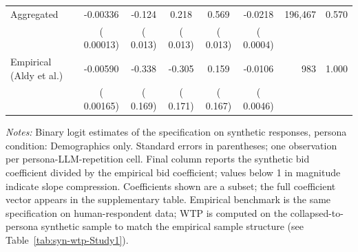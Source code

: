 \begin{table}[h]
\begin{threeparttable}
\begin{tabular}{lcccccrr}
\midrule
Aggregated &  -0.00336 &  -0.124 &   0.218 &   0.569 & -0.0218 &   196,467 &  0.570 \\
 & (  0.00013) & (  0.013) & (  0.013) & (  0.013) & ( 0.0004) & & \\
\midrule
Empirical (Aldy et al.) &  -0.00590 &  -0.338 &  -0.305 &   0.159 & -0.0106 &       983 & 1.000 \\
 & (  0.00165) & (  0.169) & (  0.171) & (  0.167) & ( 0.0046) & & \\
\bottomrule
\end{tabular}
\begin{tablenotes}\footnotesize
\item \textit{Notes:} Binary logit estimates of the \textcite{Aldy2012} specification on synthetic responses, persona condition: Demographics only. 
Standard errors in parentheses; one observation per persona-LLM-repetition cell. 
Final column reports the synthetic bid coefficient divided by the empirical bid coefficient; values below 1 in magnitude indicate slope compression. 
Coefficients shown are a subset; the full coefficient vector appears in the supplementary table. 
Empirical benchmark is the same specification on \textcite{Aldy2012} human-respondent data; WTP is computed on the collapsed-to-persona synthetic sample to match the empirical sample structure (see Table~\ref{tab:syn-wtp-Study1}).
\end{tablenotes}
\end{threeparttable}
\end{table}
